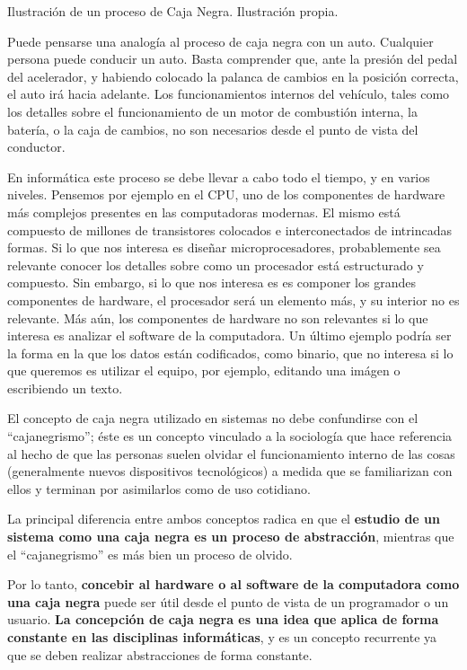 {Ilustración de un proceso de Caja Negra.}
{Ilustración propia.}

Puede pensarse una analogía al proceso de caja negra con un auto. Cualquier
persona puede conducir un auto. Basta comprender que, ante la presión del
pedal del acelerador, y habiendo colocado la palanca de cambios en la posición
correcta, el auto irá hacia adelante. Los funcionamientos internos del vehículo,
tales como los detalles sobre el funcionamiento de un motor de combustión
interna, la batería, o la caja de cambios, no son necesarios desde el punto de
vista del conductor.

En informática este proceso se debe llevar a cabo todo el tiempo, y en varios niveles.
Pensemos por ejemplo en el CPU, uno de los componentes de hardware más
complejos presentes en las computadoras modernas. El mismo está compuesto
de millones de transistores colocados e interconectados de intrincadas formas.
Si lo que nos interesa es diseñar microprocesadores, probablemente sea relevante
conocer los detalles sobre como un procesador está estructurado y compuesto. Sin
embargo, si lo que nos interesa es es componer los grandes componentes de hardware,
el procesador será un elemento más, y su interior no es relevante. Más aún, los
componentes de hardware no son relevantes si lo que interesa es analizar el
software de la computadora. Un último ejemplo podría ser la forma en la que los
datos están codificados, como binario, que no interesa si lo que queremos es
utilizar el equipo, por ejemplo, editando una imágen o escribiendo un texto.

El concepto de caja negra utilizado en sistemas no debe confundirse con el
``cajanegrismo''; éste es un concepto vinculado a la sociología que hace
referencia al hecho de que las personas suelen olvidar el funcionamiento interno
de las cosas (generalmente nuevos dispositivos tecnológicos) a medida que se
familiarizan con ellos y terminan por asimilarlos como de uso cotidiano.

La principal diferencia entre ambos conceptos radica en que el \textbf{estudio
de un sistema como una caja negra es un proceso de abstracción}, mientras que el
``cajanegrismo'' es más bien un proceso de olvido.

Por lo tanto, \textbf{concebir al hardware o al software de la computadora como
una caja negra} puede ser útil desde el punto de vista de un programador o un usuario.
\textbf{La concepción de caja negra es una idea que aplica de forma constante en
las disciplinas informáticas}, y es un concepto recurrente ya que se deben realizar
abstracciones de forma constante.

